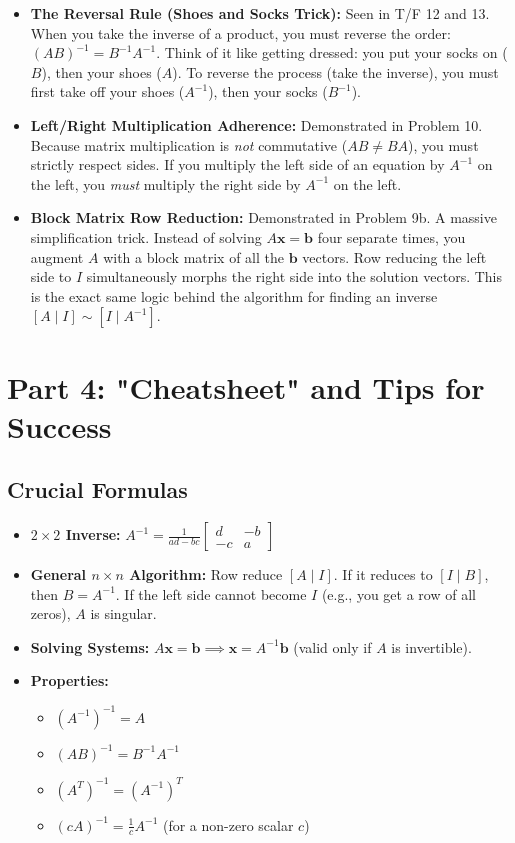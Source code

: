 \documentclass[11pt]{article}
\begin{document}
\begin{itemize}
    \item \textbf{The Reversal Rule (Shoes and Socks Trick):} Seen in T/F 12 and 13. When you take the inverse of a product, you must reverse the order: $(AB)^{-1} = B^{-1}A^{-1}$. Think of it like getting dressed: you put your socks on ($B$), then your shoes ($A$). To reverse the process (take the inverse), you must first take off your shoes ($A^{-1}$), then your socks ($B^{-1}$).
    \item \textbf{Left/Right Multiplication Adherence:} Demonstrated in Problem 10. Because matrix multiplication is \textit{not} commutative ($AB \neq BA$), you must strictly respect sides. If you multiply the left side of an equation by $A^{-1}$ on the left, you \textit{must} multiply the right side by $A^{-1}$ on the left.
    \item \textbf{Block Matrix Row Reduction:} Demonstrated in Problem 9b. A massive simplification trick. Instead of solving $A\mathbf{x} = \mathbf{b}$ four separate times, you augment $A$ with a block matrix of all the $\mathbf{b}$ vectors. Row reducing the left side to $I$ simultaneously morphs the right side into the solution vectors. This is the exact same logic behind the algorithm for finding an inverse $[A \mid I] \sim [I \mid A^{-1}]$.
\end{itemize}

\newpage
\section{Part 4: "Cheatsheet" and Tips for Success}

\subsection{Crucial Formulas}
\begin{itemize}
    \item \textbf{$2 \times 2$ Inverse:} $A^{-1} = \frac{1}{ad - bc} \begin{bmatrix} d & -b \\ -c & a \end{bmatrix}$
    \item \textbf{General $n \times n$ Algorithm:} Row reduce $[ A \mid I ]$. If it reduces to $[ I \mid B ]$, then $B = A^{-1}$. If the left side cannot become $I$ (e.g., you get a row of all zeros), $A$ is singular.
    \item \textbf{Solving Systems:} $A\mathbf{x} = \mathbf{b} \implies \mathbf{x} = A^{-1}\mathbf{b}$ (valid only if $A$ is invertible).
    \item \textbf{Properties:} 
        \begin{itemize}
            \item $(A^{-1})^{-1} = A$
            \item $(AB)^{-1} = B^{-1}A^{-1}$
            \item $(A^T)^{-1} = (A^{-1})^T$
            \item $(cA)^{-1} = \frac{1}{c}A^{-1}$ (for a non-zero scalar $c$)
        \end{itemize}
\end{itemize}
\end{document}
